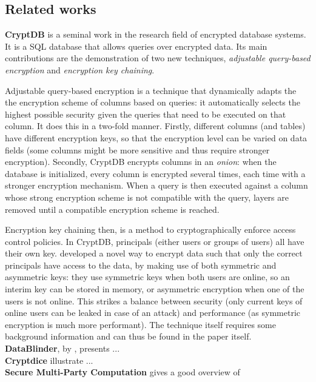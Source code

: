 \subsection{Related works}
\noindent \textbf{CryptDB} \citep{cryptdb} is a seminal work in the research field of encrypted database systems. It is a SQL database that allows queries over encrypted data. Its main contributions are the demonstration of two new techniques, \textit{adjustable query-based encryption} and \textit{encryption key chaining}. 

Adjustable query-based encryption is a technique that dynamically adapts the the encryption scheme of columns based on queries: it automatically selects the highest possible security given the queries that need to be executed on that column. It does this in a two-fold manner. Firstly, different columns (and tables) have different encryption keys, so that the encryption level can be varied on data fields (some columns might be more sensitive and thus require stronger encryption). Secondly, CryptDB encrypts columns in an \textit{onion}: when the database is initialized, every column is encrypted several times, each time with a stronger encryption mechanism. When a query is then executed against a column whose strong encryption scheme is not compatible with the query, layers are removed until a compatible encryption scheme is reached. 

Encryption key chaining then, is a method to cryptographically enforce access control policies. In CryptDB, principals (either users or groups of users) all have their own key. \citeauthor{cryptdb} developed a novel way to encrypt data such that only the correct principals have access to the data, by making use of both symmetric and asymmetric keys: they use symmetric keys when both users are online, so an interim key can be stored in memory, or asymmetric encryption when one of the users is not online. This strikes a balance between security (only current keys of online users can be leaked in case of an attack) and performance (as symmetric encryption is much more performant). The technique itself requires some background information and can thus be found in the paper itself.\\

\noindent \textbf{DataBlinder}, by \citet{datablinder}, presents ... \\

\noindent \textbf{Cryptdice} \citep{cryptdice} illustrate ...\\

\noindent \textbf{Secure Multi-Party Computation} \citep{secure-mpc} gives a good overview of\\

